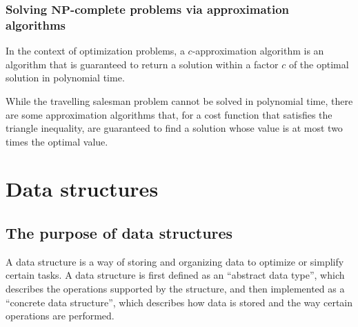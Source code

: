 \documentclass{report}
\begin{document}
\subsection{Solving $\mathbf{NP}$-complete problems via approximation algorithms}
In the context of optimization problems, a $\displaystyle c$-approximation algorithm is an algorithm that is guaranteed to return a solution within a factor $\displaystyle c$ of the optimal solution in polynomial time.
\begin{examplebox}
    While the travelling salesman problem cannot be solved in polynomial time, there are some approximation algorithms that, for a cost function that satisfies the triangle inequality, are guaranteed to find a solution whose value is at most two times the optimal value.
\end{examplebox}

\chapter{Data structures}
\section{The purpose of data structures}
A data structure is a way of storing and organizing data to optimize or simplify certain tasks. \newline
A data structure is first defined as an ``abstract data type'', which describes the operations supported by the structure, and then implemented as a ``concrete data structure'', which describes how data is stored and the way certain operations are performed.
\end{document}
